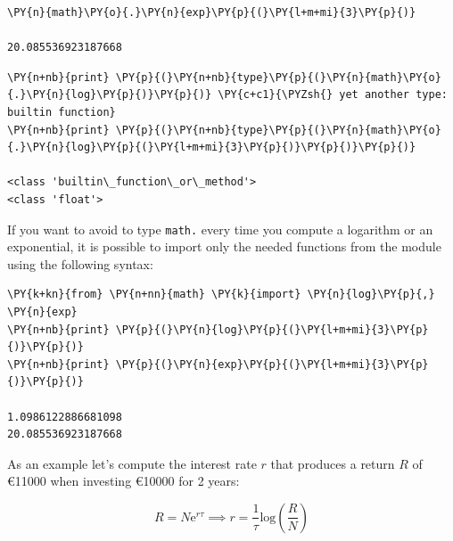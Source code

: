 \begin{tcolorbox}[breakable, size=fbox, boxrule=1pt, pad at break*=1mm, colback=cellbackground, colframe=cellborder]            
\begin{Verbatim}[commandchars=\\\{\}]
\PY{n}{math}\PY{o}{.}\PY{n}{exp}\PY{p}{(}\PY{l+m+mi}{3}\PY{p}{)}

20.085536923187668
\end{Verbatim}
\end{tcolorbox}

\begin{tcolorbox}[breakable, size=fbox, boxrule=1pt, pad at break*=1mm, colback=cellbackground, colframe=cellborder]            
\begin{Verbatim}[commandchars=\\\{\}]
\PY{n+nb}{print} \PY{p}{(}\PY{n+nb}{type}\PY{p}{(}\PY{n}{math}\PY{o}{.}\PY{n}{log}\PY{p}{)}\PY{p}{)} \PY{c+c1}{\PYZsh{} yet another type: builtin function}
\PY{n+nb}{print} \PY{p}{(}\PY{n+nb}{type}\PY{p}{(}\PY{n}{math}\PY{o}{.}\PY{n}{log}\PY{p}{(}\PY{l+m+mi}{3}\PY{p}{)}\PY{p}{)}\PY{p}{)}

<class 'builtin\_function\_or\_method'>
<class 'float'>
\end{Verbatim}
\end{tcolorbox}

If you want to avoid to type \texttt{math.} every time you compute a logarithm or an exponential, 
it is possible to import only the needed functions from the module using the following syntax:

\begin{tcolorbox}[breakable, size=fbox, boxrule=1pt, pad at break*=1mm, colback=cellbackground, colframe=cellborder]            
\begin{Verbatim}[commandchars=\\\{\}]
\PY{k+kn}{from} \PY{n+nn}{math} \PY{k}{import} \PY{n}{log}\PY{p}{,} \PY{n}{exp}
\PY{n+nb}{print} \PY{p}{(}\PY{n}{log}\PY{p}{(}\PY{l+m+mi}{3}\PY{p}{)}\PY{p}{)}
\PY{n+nb}{print} \PY{p}{(}\PY{n}{exp}\PY{p}{(}\PY{l+m+mi}{3}\PY{p}{)}\PY{p}{)}

1.0986122886681098
20.085536923187668
\end{Verbatim}
\end{tcolorbox}

As an example let's compute the interest rate \(r\) that produces a return \(R\) of 
\euro 11000 when investing \euro 10000 for 2 years:

\[R = N\mathrm{e}^{r\tau} \implies r = \frac{1}{\tau} \mathrm{log}(\frac{R}{N})\]

